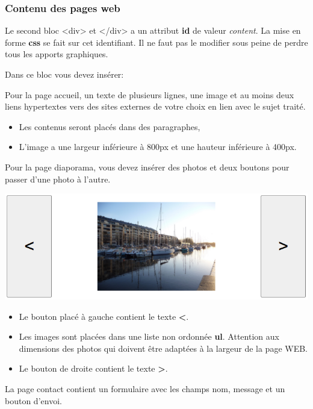 \hypertarget{contenu-des-pages-web}{%
\subsubsection{Contenu des pages web}\label{contenu-des-pages-web}}

Le second bloc \textless div\textgreater{} et
\textless/div\textgreater{} a un attribut \textbf{id} de valeur
\emph{content}. La mise en forme \textbf{css} se fait sur cet
identifiant. Il ne faut pas le modifier sous peine de perdre tous les
apports graphiques.

Dans ce bloc vous devez insérer:

Pour la page accueil, un texte de plusieurs lignes, une image et au
moins deux liens hypertextes vers des sites externes de votre choix en
lien avec le sujet traité.

\begin{itemize}
\tightlist
\item
  Les contenus seront placés dans des paragraphes,
\item
  L'image a une largeur inférieure à 800px et une hauteur inférieure à
  400px.
\end{itemize}

Pour la page diaporama, vous devez insérer des photos et deux boutons
pour passer d'une photo à l'autre.

\includegraphics{img/diaporama.png}

\begin{itemize}
\tightlist
\item
  Le bouton placé à gauche contient le texte \textbf{\textless{}}.
\item
  Les images sont placées dans une liste non ordonnée \textbf{ul}.
  Attention aux dimensions des photos qui doivent être adaptées à la
  largeur de la page WEB.
\item
  Le bouton de droite contient le texte \textbf{\textgreater{}}.
\end{itemize}

La page contact contient un formulaire avec les champs nom, message et
un bouton d'envoi.

